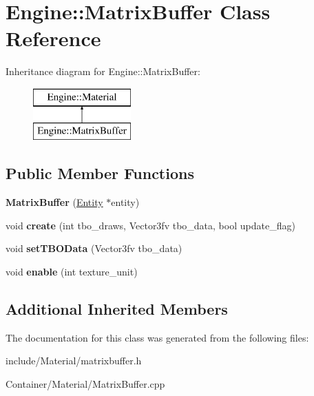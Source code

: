 \hypertarget{classEngine_1_1MatrixBuffer}{}\section{Engine\+:\+:Matrix\+Buffer Class Reference}
\label{classEngine_1_1MatrixBuffer}
Inheritance diagram for Engine\+:\+:Matrix\+Buffer\+:\begin{figure}[H]
\begin{center}
\leavevmode
\includegraphics[height=2.000000cm]{classEngine_1_1MatrixBuffer}
\end{center}
\end{figure}
\subsection*{Public Member Functions}
\begin{DoxyCompactItemize}
\item 
\hypertarget{classEngine_1_1MatrixBuffer_a6efea6edf2c22333a08e70a39464d97f}{}{\bfseries Matrix\+Buffer} (\hyperlink{classEngine_1_1Entity}{Entity} $\ast$entity)\label{classEngine_1_1MatrixBuffer_a6efea6edf2c22333a08e70a39464d97f}

\item 
\hypertarget{classEngine_1_1MatrixBuffer_ae1956d5ccefd322ced2d1ae5bbecad5b}{}void {\bfseries create} (int tbo\+\_\+draws, Vector3fv tbo\+\_\+data, bool update\+\_\+flag)\label{classEngine_1_1MatrixBuffer_ae1956d5ccefd322ced2d1ae5bbecad5b}

\item 
\hypertarget{classEngine_1_1MatrixBuffer_a498dae58a6e73ccea9abbcd942b9c514}{}void {\bfseries set\+T\+B\+O\+Data} (Vector3fv tbo\+\_\+data)\label{classEngine_1_1MatrixBuffer_a498dae58a6e73ccea9abbcd942b9c514}

\item 
\hypertarget{classEngine_1_1MatrixBuffer_a7a012f4da7b821d55dc4f7ff68a388f0}{}void {\bfseries enable} (int texture\+\_\+unit)\label{classEngine_1_1MatrixBuffer_a7a012f4da7b821d55dc4f7ff68a388f0}

\end{DoxyCompactItemize}
\subsection*{Additional Inherited Members}


The documentation for this class was generated from the following files\+:\begin{DoxyCompactItemize}
\item 
include/\+Material/matrixbuffer.\+h\item 
Container/\+Material/Matrix\+Buffer.\+cpp\end{DoxyCompactItemize}
